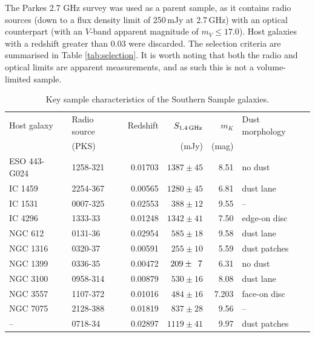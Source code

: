 	The Parkes 2.7 GHz survey \citep{Ekers1989} was used as a parent sample, as it contains radio sources (down to a flux density limit of 250\,mJy at 2.7\,GHz) with an optical counterpart (with an $V$-band apparent magnitude of $m_V \le 17.0$). Host galaxies with a redshift greater than 0.03 were discarded. The selection criteria are summarised in Table \ref{tab:selection}. It is worth noting that both the radio and optical limits are apparent measurements, and as such this is not a volume-limited sample.

	\begin{table}
		\centering
	\begin{threeparttable}
		\caption{Key sample characteristics of the Southern Sample galaxies.}
		\label{tab:sample}
		\begin{tabular}{l l r r r l}
			\hline
			\hline
			Host galaxy	& Radio source 	& Redshift	& $S_\text{1.4\,GHz}$	& $m_K$ & Dust morphology\\
						& (PKS) 		& 			& (mJy) 			& (mag)	&\\
			\hline 
			ESO 443-G024 & 1258-321 	& 0.01703	& $1387 \pm 45$		& 8.51 & no dust\tnote{a}	\\ 
			IC 1459 	& 2254-367 		& 0.00565 	& $1280 \pm 45$		& 6.81 & dust lane\tnote{b}	\\
			IC 1531 	& 0007-325 		& 0.02553 	& $388 \pm 12$		& 9.55 & --					\\
			IC 4296		& 1333-\leavevmode\phantom{0}33 		& 0.01248 	& $1342 \pm 41$		& 7.50 & edge-on disc\tnote{b} \\
			NGC 612 	& 0131-\leavevmode\phantom{0}36 		& 0.02954 	& $585 \pm 18$		& 9.58 & dust lane\tnote{c}	\\
			NGC 1316 	& 0320-\leavevmode\phantom{0}37 & 0.00591 	& $255 \pm 10$		& 5.59 & dust patches\tnote{b} \\
			NGC 1399 	& 0336-\leavevmode\phantom{0}35 & 0.00472 	& $209 \pm \leavevmode\phantom{0}7$	& 6.31 & no dust\tnote{b}	\\
			NGC 3100 	& 0958-314 		& 0.00879 	& $530 \pm 16$		& 8.08 & dust lane\tnote{d}	\\
			NGC 3557 	& 1107-372 		& 0.01016 	& $484 \pm 16$		& 7.203 & face-on disc\tnote{b}\\
			NGC 7075 	& 2128-388 		& 0.01819 	& $837 \pm 28$		& 9.56 & --					\\
			--			& 0718-\leavevmode\phantom{0}34 		& 0.02897 	& $1119 \pm 41$		& 9.97 & dust patches\tnote{e} \\
			\hline
			\hline
		\end{tabular}

\end{threeparttable}
\end{table}
